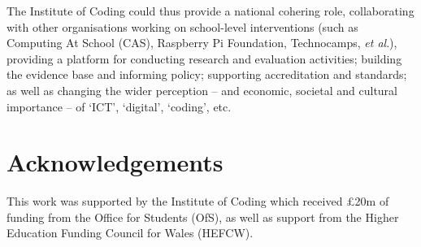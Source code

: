 \documentclass[sigconf]{acmart}
\begin{document}

The Institute of Coding could thus provide a national cohering role,
collaborating with other organisations working on school-level
interventions (such as Computing At School (CAS), Raspberry Pi
Foundation, Technocamps, {\it et al\/}.), providing a platform for conducting
research and evaluation activities; building the evidence base and
informing policy; supporting accreditation and standards; as well as
changing the wider perception -- and economic, societal and cultural
importance -- of `ICT', `digital', `coding', etc.


\section*{Acknowledgements}

This work was supported by the Institute of Coding which received
\pounds20m of funding from the Office for Students (OfS), as well as
support from the Higher Education Funding Council for Wales (HEFCW).
\ifanon
\fi


 
\end{document}
